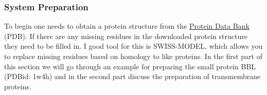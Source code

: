 \documentclass[9pt,tutorial]{livecoms}
\begin{document}
\subsubsection{System Preparation}


To begin one needs to obtain a protein structure from the \href{https://www.rcsb.org/}{Protein Data Bank} (PDB).\cite{Berman_NucleicAcidsRes_2000_v28_p235}
If there are any missing residues in the downloaded protein structure they need to be filled in.
I good tool for this is SWISS-MODEL\cite{Waterhouse_NucleicAcidsRes_2018_v46_p296}, which allows you to replace missing residues based on homology to like proteins.
In the first part of this section we will go through an example for preparing the small protein BBL (PDBid: 1w4h)\cite{Ferguson_JMolBiol_2005_v353_p427} and in the second part discuss the preparation of transmembrane proteins.
\end{document}
